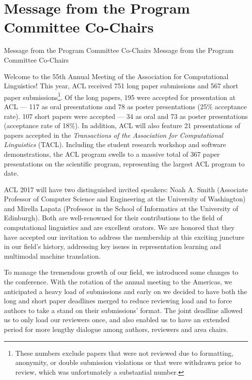 \section{Message from the Program Committee Co-Chairs}
\setheaders%
    {Message from the Program Committee Co-Chairs}%
    {Message from the Program Committee Co-Chairs}
\thispagestyle{emptyheader}

\setlength{\parskip}{.7ex}

Welcome to the 55th Annual Meeting of the Association for
Computational Linguistics! This year, ACL received 751 long paper
submissions and 567 short paper submissions\footnote{These numbers
  exclude papers that were not reviewed due to formatting, anonymity,
  or double submission violations or that were withdrawn prior to
  review, which was unfortunately a substantial number.}. Of the long
papers, 195 were accepted for presentation at ACL — 117 as oral
presentations and 78 as poster presentations (25\% acceptance rate).
107 short papers were accepted — 34 as oral and 73 as poster
presentations (acceptance rate of 18\%). In addition, ACL will also
feature 21 presentations of papers accepted in the {\it Transactions
  of the Association for Computational Linguistics} (TACL). Including
the student research workshop and software demonstrations, the ACL
program swells to a massive total of 367 paper presentations on the
scientific program, representing the largest ACL program to date.

ACL 2017 will have two distinguished invited speakers: Noah A. Smith
(Associate Professor of Computer Science and Engineering at the
University of Washington) and Mirella Lapata (Professor in the School
of Informatics at the University of Edinburgh).  Both are
well-renowned for their contributions to the field of computational
linguistics and are excellent orators.  We are honored that they have
accepted our invitation to address the membership at this exciting
juncture in our field's history, addressing key issues in
representation learning and multimodal machine translation.

To manage the tremendous growth of our field, we introduced some
changes to the conference. With the rotation of the annual meeting to
the Americas, we anticipated a heavy load of submissions and early on
we decided to have both the long and short paper deadlines merged to
reduce reviewing load and to force authors to take a stand on their
submissions' format.  The joint deadline allowed us to only load our
reviewers once, and also enabled us to have an extended period for
more lengthy dialogue among authors, reviewers and area chairs.  

